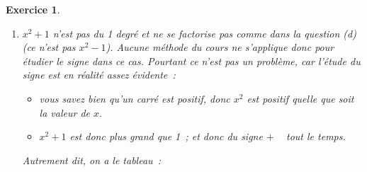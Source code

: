 \documentclass[10pt]{article}
\newtheorem{exo}{Exercice}
\begin{document}
\begin{exo}
\begin{enumerate}
\begin{enumerate}
\setlength{\columnseprule}{1pt}

\begin{multicols}{2}

On résout~:

\begin{align*}
2t&=0\\
\frac{\cancel{2}t}{\cancel{2}}&=\frac{0}{2}\\
t&=0
\end{align*}

$a=2$ $\Rightarrow$ $+$ à droite

\columnbreak

\begin{align*}
t+1&=0\\
t+\cancel{1}-\cancel{1}&=0-1\\
 t&=-1
 \end{align*}
 
 $a=1$ $\Rightarrow$ $+$ à droite

\end{multicols}

\begin{center}
\end{center}

 
\item $x^2+1$ n'est pas du 1 degré et ne se factorise pas comme dans la question (d) (\danger  ce n'est pas $x^2-1$). Aucune méthode du cours ne s'applique donc pour étudier le signe dans ce cas. Pourtant ce n'est pas un problème, car l'étude du signe est en réalité assez évidente~:

\begin{itemize}
\item[\textbullet] vous savez bien qu'un carré est positif, donc $x^2$ est positif quelle que soit la valeur de $x.$
\item[\textbullet] $x^2+1$ est donc plus grand que 1~; et donc du signe \og $+$ \fg~{} tout le temps.
\end{itemize}

Autrement dit, on a le tableau~:

\medskip
\begin{center}
\end{center}


\end{enumerate}
\end{enumerate}
\end{exo}
\end{document}
